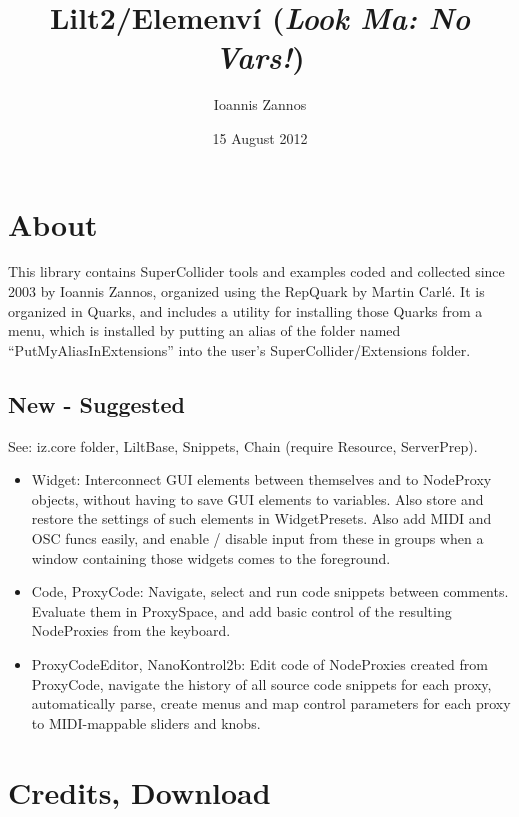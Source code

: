 \documentclass[11pt, a4paper]{scrartcl}
\begin{document}
\title{Lilt2/Elemenv\'i (\emph{Look Ma: No Vars!})}
\author{Ioannis Zannos}
\date{15 August 2012}
\maketitle


\section*{About}
\label{sec-1}


This library contains SuperCollider tools and examples coded and collected since 2003 by Ioannis Zannos, organized using the RepQuark by Martin Carl\'e. It is organized in Quarks, and includes a utility for installing those Quarks from a menu, which is installed by putting an alias of the folder named ``PutMyAliasInExtensions'' into the user's SuperCollider/Extensions folder. 
\subsection*{New - Suggested}
\label{sec-1_1}


See: iz.core folder, LiltBase, Snippets, Chain (require Resource, ServerPrep).

\begin{itemize}
\item Widget: Interconnect GUI elements between themselves and to NodeProxy objects, without having to save GUI elements to variables. Also store and restore the settings of such elements in WidgetPresets. Also add MIDI and OSC funcs easily, and enable / disable input from these in groups when a window containing those widgets comes to the foreground.
\item Code, ProxyCode: Navigate, select and run code snippets between comments. Evaluate them in ProxySpace, and add basic control of the resulting NodeProxies from the keyboard.
\item ProxyCodeEditor, NanoKontrol2b: Edit code of NodeProxies created from ProxyCode, navigate the history of all source code snippets for each proxy, automatically parse, create menus and map control parameters for each proxy to MIDI-mappable sliders and knobs.
\end{itemize}
\section*{Credits, Download}
\label{sec-2}
\end{document}
